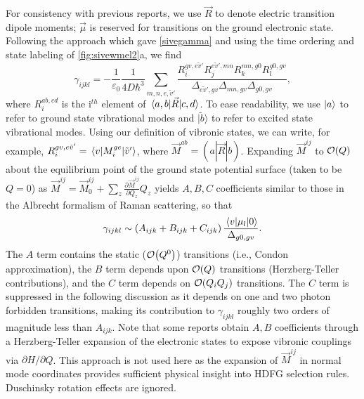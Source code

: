 \documentclass[aip, jcp, reprint, onecolumn, nofootinbib]{revtex4-2}
\begin{document}
For consistency with previous reports, we use $\vec{R}$ to denote electric transition dipole moments; $\vec{\mu}$ is reserved for transitions on the ground electronic state. \cite{Tang1970}
Following the approach which gave \autoref{sivegamma} and using the time ordering and state labeling of \autoref{fig:sivewmel2}a, we find
\begin{equation}\label{drgamma_notaylor}
	\gamma_{ijkl} = -\frac{1}{\varepsilon_0} \frac{1}{4D \hbar^3} \sum_{m,n,e,\tilde{v}'} \frac{
		R_{i}^{gv, e\tilde{v}'} 
		R_{j}^{e\tilde{v}',mn} 
		R_{k}^{mn,g0} 
		R_{l}^{g0,gv} 
	}{	\Delta_{e\tilde{v}', gv}
		\Delta_{mn, gv}
		\Delta_{g0,gv}
	},
\end{equation}
where $R_{i}^{ab,cd}$ is the i$^{th}$ element of $\mel{a,b}{\vec{R}}{c,d}$.
To ease readability, we use $\ket{a}$ to refer to ground state vibrational modes and $|\tilde{b}\rangle$ to refer to excited state vibrational modes.
Using our definition of vibronic states, we can write, for example,
$R_{i}^{gv,e\tilde{v}'} = \mel{v}{M_i^{ge}}{\tilde{v}'}$, where $\vec{M}^{ab} = (a|\vec{R}|b)$.\cite{Ziegler1974}
Expanding $\vec{M}^{ij}$ to $\order{Q}$ about the equilibrium point of the ground state potential surface (taken to be $Q = 0$) as
$\vec{M}^{ij} = \vec{M}^{ij}_0 + \sum_z \frac{\partial\vec{M}^{ij}}{\partial Q_z} Q_z$
yields $A, B, C$ coefficients similar to those in the Albrecht formalism of Raman scattering, \cite{Albrecht1961, Warshel1977, Ziegler1988} so that
\begin{equation}\label{gammaabc}
		\gamma_{ijkl} \sim \left(A_{ijk} + B_{ijk} + C_{ijk}\right) \frac{\mel{v}{\mu_{l}}{0}} {\Delta_{g0,gv}}.
\end{equation}
The $A$ term contains the static ($\order{Q^0}$) transitions (i.e., Condon approximation),\cite{Condon1928} the $B$ term depends upon $\order{Q}$ transitions (Herzberg-Teller contributions),\cite{HerzbergTeller1933} and the $C$ term depends on $\order{Q_i Q_j}$ transitions. 
The $C$ term is suppressed in the following discussion as it depends on one and two photon forbidden transitions, making its contribution to $\gamma_{ijkl}$ roughly two orders of magnitude less than $A_{ijk}$. \cite{Ziegler1988, Neddersen1989, Bonang1992}
Note that some reports obtain $A, B$ coefficients through a Herzberg-Teller expansion of the electronic states to expose vibronic couplings via $\partial H / \partial Q$.\cite{HerzbergTeller1933, Petrov1985, Neddersen1989, Baranov1990}
This approach is not used here as the expansion of $\vec{M}^{ij}$ in normal mode coordinates provides sufficient physical insight into HDFG selection rules. 
Duschinsky rotation effects\cite{Duschinsky1937} are ignored.
\end{document}
